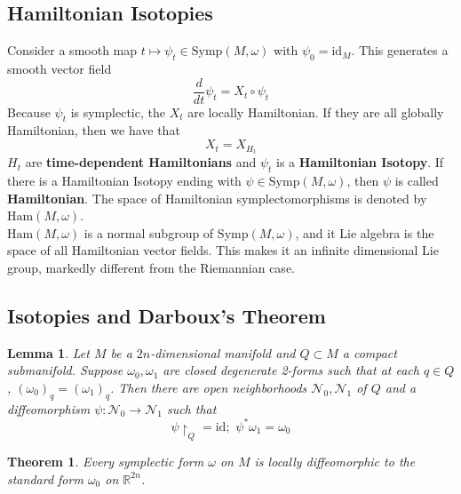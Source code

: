 \documentclass{article}
\newtheorem{thm}{Theorem}
\newtheorem{lem}{Lemma}
\begin{document}
\subsection{Hamiltonian Isotopies}
\indent Consider a smooth map $t \mapsto \psi_t \in \mathrm{Symp}(M,\omega)$ with $\psi_0=\mathrm{id}_M$. This generates a smooth vector field
\begin{equation}
    \frac{d}{dt}\psi_t = X_t \circ \psi_t
\end{equation}
\indent Because $\psi_t$ is symplectic, the $X_t$ are locally Hamiltonian. If they are all globally Hamiltonian, then we have that
\begin{equation}
    X_t = X_{H_t}
\end{equation}
\indent $H_t$ are \textbf{time-dependent Hamiltonians} and $\psi_t$ is a \textbf{Hamiltonian Isotopy}. If there is a Hamiltonian Isotopy ending with $\psi \in \mathrm{Symp}(M,\omega)$, then $\psi$ is called \textbf{Hamiltonian}. The space of Hamiltonian symplectomorphisms is denoted by $\mathrm{Ham}(M,\omega)$.\\
\indent $\mathrm{Ham}(M,\omega)$ is a normal subgroup of $\mathrm{Symp}(M,\omega)$, and it Lie algebra is the space of all Hamiltonian vector fields. This makes it an infinite dimensional Lie group, markedly different from the Riemannian case.\\
\subsection{Isotopies and Darboux's Theorem}

\begin{lem}
Let $M$ be a $2n$-dimensional manifold and $Q \subset M$ a compact submanifold. Suppose $\omega_0, \omega_1$ are closed degenerate 2-forms such that at each $q \in Q$, $(\omega_0)_q = (\omega_1)_q$. Then there are open neighborhoods $\mathcal{N}_0, \mathcal{N}_1$ of $Q$ and a diffeomorphism $\psi: \mathcal{N}_0 \to \mathcal{N}_1$ such that
\begin{equation}
    \psi \restriction_Q = \mathrm{id}; \hspace{4pt} \psi^* \omega_1 = \omega_0
\end{equation}
\end{lem}

\begin{thm}
Every symplectic form $\omega$ on $M$ is locally diffeomorphic to the standard form $\omega_0$ on $\mathbb{R}^{2n}$.
\end{thm}
\end{document}
